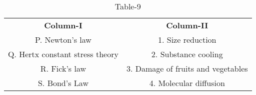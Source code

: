 \begin{table}[htbp]
  \centering
  \caption{Table-9}
  \label{tab:tables/table9.tex}
  \begin{tabular}{cc}
\textbf{Column-I} & \textbf{Column-II}\\

P. Newton's law & 1. Size reduction  \\
Q. Hertx constant stress theory & 2. Substance cooling \\
R. Fick's law & 3. Damage of fruits and vegetables \\
S. Bond's Law & 4. Molecular diffusion \\
  
  
  
  \end{tabular}
\end{table}